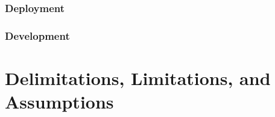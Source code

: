 \subsubsection{\ms{} Deployment}

\subsubsection{\ms{} Development}

\section{Delimitations, Limitations, and Assumptions}




















